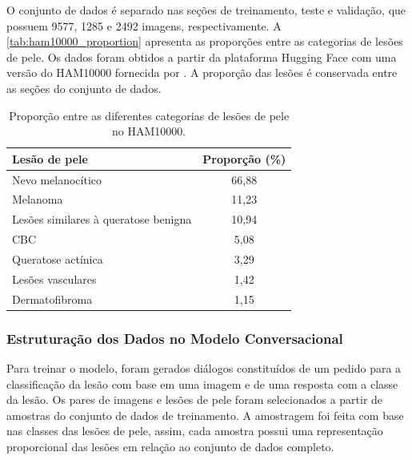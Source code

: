O conjunto de dados é separado nas seções de treinamento, teste e validação, que possuem 9577, 1285 e 2492 imagens,
respectivamente. A \autoref{tab:ham10000_proportion} apresenta as proporções entre as categorias de lesões de pele. Os
dados foram obtidos a partir da plataforma Hugging Face com uma versão do \ac{HAM10000} fornecida por
\textcite{skin_cancer_dataset}. A proporção das lesões é conservada entre as seções do conjunto de dados.

\clearpage

\begin{table}[ht]
    \caption{\small Proporção entre as diferentes categorias de lesões de pele no \ac{HAM10000}.}
    \centering
    \begin{tabular}{l|c}
        \hline
        Lesão de pele                        & Proporção (\%) \\ \hline
        Nevo melanocítico                    & 66,88          \\
        Melanoma                             & 11,23          \\
        Lesões similares à queratose benigna & 10,94          \\
        \ac{CBC}                             & 5,08           \\
        Queratose actínica                   & 3,29           \\
        Lesões vasculares                    & 1,42           \\
        Dermatofibroma                       & 1,15           \\ \hline
    \end{tabular}
    \label{tab:ham10000_proportion}
\end{table}

\subsubsection{Estruturação dos Dados no Modelo Conversacional}

Para treinar o modelo, foram gerados diálogos constituídos de um pedido para a classificação da lesão com base em uma
imagem e de uma resposta com a classe da lesão. Os pares de imagens e lesões de pele foram selecionados a partir de
amostras do conjunto de dados de treinamento. A amostragem foi feita com base nas classes das lesões de pele, assim,
cada amostra possui uma representação proporcional das lesões em relação ao conjunto de dados completo.

